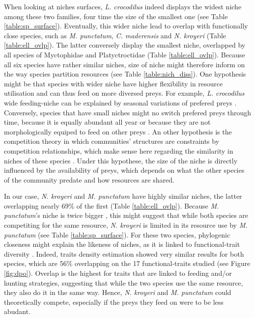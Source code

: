When looking at niches surfaces, \textit{L. crocodilus} indeed displays the widest niche among these two families, four time the size of the smallest one (see Table \ref{table:sp_surface}). Eventually, this wider niche lead to overlap with functionally close species, such as \textit{M. punctatum}, \textit{C. maderensis} and \textit{N. kroyeri} (Table \ref{table:ell_ovlp}). The latter conversely display the smallest niche, overlapped by all species of Myctophidae and Platyctroctidae (Table \ref{table:ell_ovlp}). Because all six species have rather similar niches, size of niche might therefore inform on the way species partition resources (see Table \ref{table:nich_diss}). One hypothesis might be that species with wider niche have higher flexibility in resource utilisation and can thus feed on more diversed preys. For example, \textit{L. crocodilus} wide feeding-niche can be explained by seasonal variations of prefered preys \citet{fanelli2014}. Conversely, species that have small niches might no switch prefered preys through time, because it is equally abundant all year or because they are not morphologically equiped to feed on other preys \citep{mejri2009}. An other hypothesis is the competition theory in which communities' structures are constraints by competition relationships, which make sense here regarding the similarity in niches of these species \citep{geange2011}. Under this hypothese, the size of the niche is directly influenced by the availability of preys, which depends on what the other species of the community predate and how resources are shared.

In our case, \textit{N. kroyeri} and \textit{M. punctatum} have highly similar niches, the latter overlapping nearly 69\% of the first (Table \ref{table:ell_ovlp}). Because \textit{M. punctatum}'s niche is twice bigger , this might suggest that while both species are competiting for the same resource, \textit{N. kroyeri} is limited in its resource use by \textit{M. punctatum} (see Table \ref{table:sp_surface}). For these two species, phylogenic closeness might explain the likeness of niches, as it is linked to functional-trait diversity \citep{tucker2018}. Indeed, traits density estimation showed very similar results for both species, which are 56\% overlapping on the 17 functional-traits studied (see Figure \ref{fig:dpo}). Overlap is the highest for traits that are linked to feeding and/or hunting strategies, suggesting that while the two species use the same resource, they also do it in the same way. Hence, \textit{N. kroyeri} and \textit{M. punctatum} could theoretically compete, especially if the preys they feed on were to be less abudant. 

